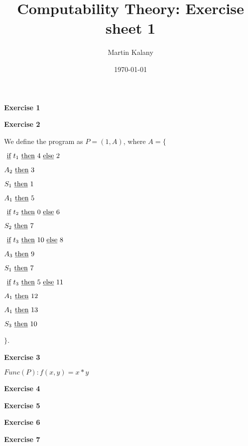 \documentclass [11pt]{article}
\title{Computability Theory: Exercise sheet 1}
\author{Martin Kalany}
\date{\today}
\newcommand{\IF}{\text{ \underline{if} }}
\newcommand{\THEN}{\text{ \underline{then} }}
\newcommand{\ELSE}{\text{ \underline{else} }}
\newcommand{\ITE}[3]{$\IF t_{#1} \THEN #2 \ELSE #3$}
\newcommand{\ADD}[2]{$A_{#1} \THEN #2$}
\newcommand{\SUB}[2]{$S_{#1} \THEN #2$}
\begin{document}
\maketitle

\bigskip
\noindent
\textbf{Exercise 1}

\bigskip
\noindent
\textbf{Exercise 2}

We define the program as $P=(1,A)$, where $A = \{$ 
\begin{compactenum}[1:]
\item \ITE{1}{4}{2} 
\item \ADD{2}{3}
\item \SUB{1}{1}
\item \ADD{1}{5}
\item \ITE{2}{0}{6}
\item \SUB{2}{7}
\item \ITE{3}{10}{8}
\item \ADD{3}{9}
\item \SUB{1}{7}
\item \ITE{3}{5}{11}
\item \ADD{1}{12}
\item \ADD{1}{13}
\item \SUB{3}{10}

\end{compactenum}
$\}$.


\bigskip
\noindent
\textbf{Exercise 3}

$Func(P): f(x,y) = x*y$

\bigskip
\noindent
\textbf{Exercise 4}

\bigskip
\noindent
\textbf{Exercise 5}

\bigskip
\noindent
\textbf{Exercise 6}

\bigskip
\noindent
\textbf{Exercise 7}
\end{document}
